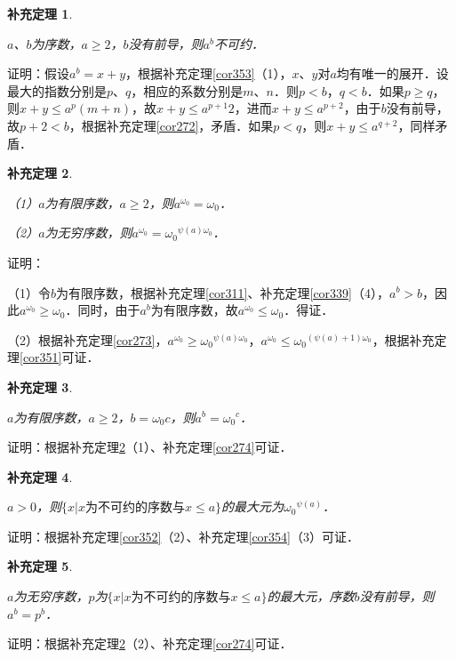 \documentclass[12pt, a4paper, oneside]{book}
\newtheorem{cor}{补充定理}
\begin{document}
			\begin{cor}\label{cor357}
				\hfill\par
				$a$、$b$为序数，$a\geq 2$，$b$没有前导，则$a^b$不可约．
			\end{cor}
			证明：假设$a^b=x+y$，根据补充定理\ref{cor353}（1），$x$、$y$对$a$均有唯一的展开．设最大的指数分别是$p$、$q$，相应的系数分别是$m$、$n$．则$p<b$，$q<b$．如果$p\geq q$，则$x+y\leq a^p(m+n)$，故$x+y\leq a^{p+1}2$，进而$x+y\leq a^{p+2}$，由于$b$没有前导，故$p+2<b$，根据补充定理\ref{cor272}，矛盾．如果$p<q$，则$x+y\leq a^{q+2}$，同样矛盾．
			
			\begin{cor}\label{cor358}
				\hfill\par
				（1）$a$为有限序数，$a\geq 2$，则$a^{\omega_0}=\omega_0$．
				\par
				（2）$a$为无穷序数，则$a^{\omega_0}={\omega_0}^{\psi(a)\omega_0}$．
			\end{cor}
			证明：
			\par
			（1）令$b$为有限序数，根据补充定理\ref{cor311}、补充定理\ref{cor339}（4），$a^b>b$，因此$a^{\omega_0}\geq \omega_0$．同时，由于$a^b$为有限序数，故$a^{\omega_0}\leq \omega_0$．得证．
			\par
			（2）根据补充定理\ref{cor273}，$a^{\omega_0}\geq {\omega_0}^{\psi(a)\omega_0}$，$a^{\omega_0}\leq {\omega_0}^{(\psi(a)+1)\omega_0}$，根据补充定理\ref{cor351}可证．
			
			\begin{cor}\label{cor359}
				\hfill\par
				$a$为有限序数，$a\geq 2$，$b=\omega_0c$，则$a^b={\omega_0}^c$．
			\end{cor}
			证明：根据补充定理\ref{cor358}（1）、补充定理\ref{cor274}可证．
			
			\begin{cor}\label{cor360}
				\hfill\par
				$a>0$，则$\{x|x\text{为不可约的序数}\text{与}x\leq a\}$的最大元为${\omega_0}^{\psi(a)}$．
			\end{cor}
			证明：根据补充定理\ref{cor352}（2）、补充定理\ref{cor354}（3）可证．
			
			\begin{cor}\label{cor361}
				\hfill\par
				$a$为无穷序数，$p$为$\{x|x\text{为不可约的序数}\text{与}x\leq a\}$的最大元，序数$b$没有前导，则$a^b=p^b$．
			\end{cor}
			证明：根据补充定理\ref{cor358}（2）、补充定理\ref{cor274}可证．
			
\end{document}
